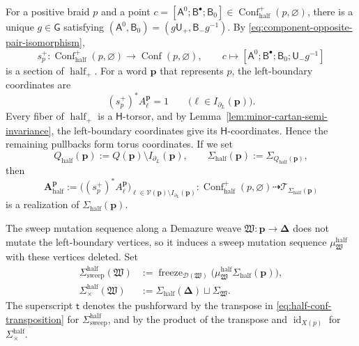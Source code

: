 \documentclass[10pt,a4paper]{article}
\theoremstyle{definition}
\theoremstyle{remark}
\newcommand{\flagA}{\mathsf{A}}
\newcommand{\flagB}{\mathsf{B}}
\newcommand{\groupG}{\mathsf{G}}
\newcommand{\borelB}{\mathsf{B}}
\newcommand{\unipotentU}{\mathsf{U}}
\newcommand{\torusH}{\mathsf{H}}
\newcommand{\Conf}{\operatorname{Conf}}
\newcommand{\Confhalf}{\operatorname{Conf}_{\mathrm{half}}}
\newcommand{\Tcal}{\mathcal T}
\newcommand{\Dcal}{\mathcal D}
\newcommand{\Vcal}{\mathcal V}
\newcommand{\fW}{\mathfrak W}
\newcommand{\id}{\operatorname{id}}
\begin{document}
For a positive braid \(p\) and a point
\(c=[\flagA^0;\flagB^\bullet;\flagB_0]
\in\Confhalf^+(p,\varnothing)\), there is a unique \(g\in\groupG\) satisfying
\((\flagA^0,\flagB_0)=(g\unipotentU_+,\borelB_-g^{-1})\).  By
\eqref{eq:component-opposite-pair-isomorphism},
\[
 s_p^+:\Confhalf^+(p,\varnothing)\longrightarrow\Conf(p,\varnothing),
 \qquad
 c\longmapsto
 [\flagA^0;\flagB^\bullet;\flagB_0;\unipotentU_-g^{-1}]
\]
is a section of \(\operatorname{half}_+\).  For a word \(\mathbf p\) that
represents \(p\), the left-boundary coordinates are
\[
 (s_p^+)^*A_\ell^{\mathbf p}=1
 \qquad
 \bigl(\ell\in I_{\partial_L}(\mathbf p)\bigr).
\]
Every fiber of \(\operatorname{half}_+\) is a \(\torusH\)-torsor, and by
Lemma~\ref{lem:minor-cartan-semi-invariance}, the left-boundary coordinates
give its \(\torusH\)-coordinates.  Hence the remaining pullbacks form torus
coordinates.  If we set
\[
 Q_{\mathrm{half}}(\mathbf p)
 :=Q(\mathbf p)\setminus I_{\partial_L}(\mathbf p),
 \qquad
 \Sigma_{\mathrm{half}}(\mathbf p)
 :=\Sigma_{Q_{\mathrm{half}}(\mathbf p)},
\]
then
\[
 \mathbf A_{\mathrm{half}}^{\mathbf p}
 :=
 \bigl((s_p^+)^*A_\ell^{\mathbf p}\bigr)_{
  \ell\in\Vcal(\mathbf p)\setminus I_{\partial_L}(\mathbf p)}
 :
 \Confhalf^+(p,\varnothing)
 \dashrightarrow\Tcal_{\Sigma_{\mathrm{half}}(\mathbf p)}
\]
is a realization of \(\Sigma_{\mathrm{half}}(\mathbf p)\).

The sweep mutation sequence along a Demazure weave
\(\fW:\mathbf p\to\boldsymbol\Delta\) does not mutate the left-boundary
vertices, so it induces a sweep mutation sequence
\(\mu_\fW^{\mathrm{half}}\) with these vertices deleted.  Set
\[
 \begin{aligned}
 \Sigma_{\mathrm{sweep}}^{\mathrm{half}}(\fW)
 &:=
 \operatorname{freeze}_{\Dcal(\fW)}
 \bigl(\mu_\fW^{\mathrm{half}}\Sigma_{\mathrm{half}}(\mathbf p)\bigr),\\
 \Sigma_{\times}^{\mathrm{half}}(\fW)
 &:=
 \Sigma_{\mathrm{half}}(\boldsymbol\Delta)\sqcup\Sigma_\fW.
 \end{aligned}
\]
The superscript \({\mathsf t}\) denotes the pushforward by the transpose in
\eqref{eq:half-conf-transposition} for
\(\Sigma_{\mathrm{sweep}}^{\mathrm{half}}\), and by the product of the
transpose and \(\id_{X(p)}\) for \(\Sigma_\times^{\mathrm{half}}\).
\end{document}
